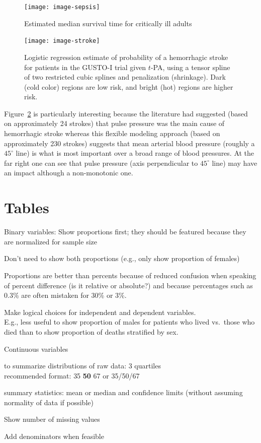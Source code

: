 \begin{figure}[!htbp]\leavevmode%
 \centerline{\texttt{[image: image-sepsis]}}
 \caption{Estimated median survival time for critically ill adults}
 \label{fig:descript-image-sepsis}
 \end{figure}

\begin{figure}[!htbp]\leavevmode%
 \centerline{\texttt{[image: image-stroke]}}
 \caption[Probability of hemorrhagic stroke vs.\ blood
 pressures]{Logistic regression estimate of probability of a
   hemorrhagic stroke for patients in the GUSTO-I trial given $t$-PA,
   using a tensor spline of two restricted cubic splines and
   penalization (shrinkage).  Dark (cold color) regions are low risk,
   and bright (hot) regions are higher risk.}
 \label{fig:descript-image-stroke}
 \end{figure}
 
 Figure~\ref{fig:descript-image-stroke} is particularly interesting
 because the literature had suggested (based on approximately 24
 strokes) that pulse pressure was the main
 cause of hemorrhagic stroke whereas this flexible modeling approach
 (based on approximately 230 strokes)
 suggests that mean arterial blood pressure (roughly a $45^\circ$ line)
 is what is most important 
 over a broad range of blood pressures.  At the far right one can see
 that pulse pressure (axis perpendicular to $45^\circ$ line) may have
 an impact although a non-monotonic one.

\clearpage
\section{Tables}
\bi
\item Binary variables: Show proportions first; they should be
  featured because they are normalized for sample size
  \bi
  \item Don't need to show both proportions (e.g., only show
    proportion of females)
  \item Proportions are better than percents because of reduced
    confusion when speaking of percent difference (is it relative or
    absolute?) and because percentages such as 0.3\% are often
    mistaken for 30\% or 3\%.
  \ei
\item Make logical choices for independent and dependent variables. \\
 E.g., less useful to show proportion of males for patients who lived
 vs.\ those who died than to show proportion of deaths stratified by
 sex.
\item Continuous variables
 \bi
 \item to summarize distributions of raw data: 3 quartiles \\
   recommended format: {\small 35} \textbf{50} {\small 67} or
   35/50/67
 \item summary statistics: mean or median and confidence limits
   (without assuming normality of data if possible)
 \ei
\item Show number of missing values
\item Add denominators when feasible
\ei

